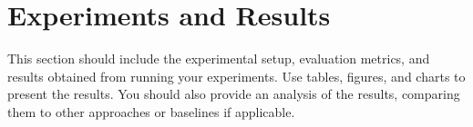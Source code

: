 \section{Experiments and Results}

This section should include the experimental setup, evaluation metrics, and results obtained from running your experiments. Use tables, figures, and charts to present the results. You should also provide an analysis of the results, comparing them to other approaches or baselines if applicable.

%
